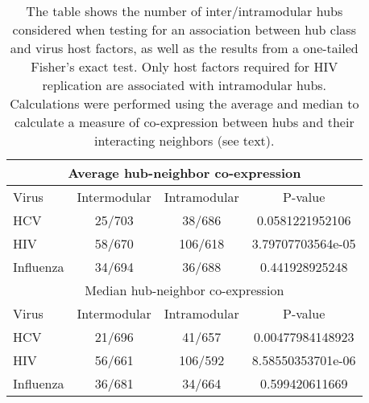 \begin{table}\footnotesize
\begin{center}
\begin{tabular}{|l|c|c|c|}
\hline
\multicolumn{4}{|c|}{Average hub-neighbor co-expression}\\
\hline
Virus & Intermodular & Intramodular & P-value \\
\hline
HCV &  25/703 & 38/686 & 0.0581221952106       \\
HIV &   58/670 &  106/618 & 3.79707703564e-05    \\
Influenza & 34/694 & 36/688&  0.441928925248 \\
\hline
\hline
\multicolumn{4}{|c|}{Median hub-neighbor co-expression}\\
\hline
Virus & Intermodular & Intramodular & P-value \\
\hline
HCV &   21/696  & 41/657  & 0.00477984148923   \\ 
HIV & 56/661  & 106/592 & 8.58550353701e-06\\
Influenza & 36/681  & 34/664  & 0.599420611669\\
\hline
  \end{tabular}
\end{center}
\caption[Fisher's test for virus hub host factor preference]{\small
  The table shows the number of inter/intramodular hubs considered
  when testing for an association between hub class and virus host
  factors, as well as the results from a one-tailed Fisher's exact
  test. Only host factors required for HIV replication are associated
  with intramodular hubs. Calculations were performed using the
  average and median to calculate a measure of co-expression between
  hubs and their interacting neighbors (see
  text). \label{tbl:sysBio:rnaiFisher}}
\end{table}
